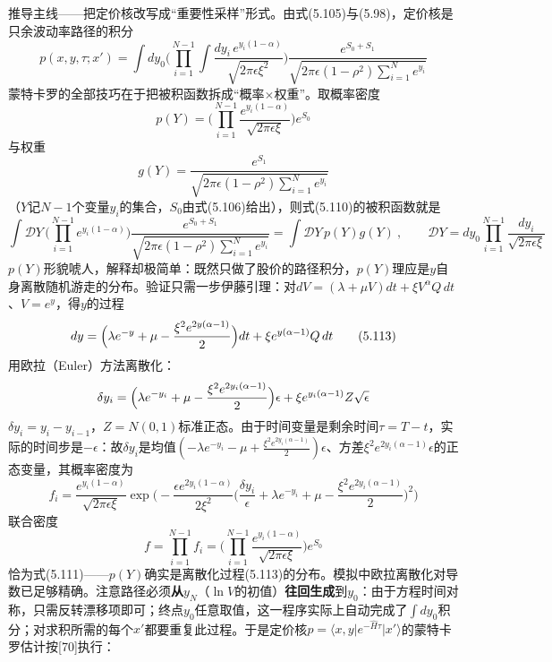 推导主线——把定价核改写成“重要性采样”形式。由式(5.105)与(5.98)，定价核是只余波动率路径的积分
\begin{equation*}
p(x,y,\tau;x')=\int dy_0\biggl(\prod_{i=1}^{N-1}\int
\frac{dy_i\,e^{y_i(1-\alpha)}}{\sqrt{2\pi\epsilon\xi^{2}}}\biggr)
\frac{e^{S_0+S_1}}{\sqrt{2\pi\epsilon(1-\rho^{2})\sum_{i=1}^{N}e^{y_i}}}
\tag{5.110}
\end{equation*}
蒙特卡罗的全部技巧在于把被积函数拆成“概率$\times$权重”。取概率密度
\begin{equation*}
p(Y)=\biggl(\prod_{i=1}^{N-1}\frac{e^{y_i(1-\alpha)}}{\sqrt{2\pi\epsilon\xi}}\biggr)e^{S_0}
\tag{5.111}
\end{equation*}
与权重
\begin{equation*}
g(Y)=\frac{e^{S_1}}{\sqrt{2\pi\epsilon(1-\rho^{2})\sum_{i=1}^{N}e^{y_i}}}
\tag{5.112}
\end{equation*}
（$Y$记$N-1$个变量$y_i$的集合，$S_0$由式(5.106)给出），则式(5.110)的被积函数就是
\begin{equation*}
\int\mathcal{D}Y\,\biggl(\prod_{i=1}^{N-1}e^{y_i(1-\alpha)}\biggr)
\frac{e^{S_0+S_1}}{\sqrt{2\pi\epsilon(1-\rho^{2})\sum_{i=1}^{N}e^{y_i}}}
=\int\mathcal{D}Y\,p(Y)g(Y)\ ,\qquad
\mathcal{D}Y=dy_0\prod_{i=1}^{N-1}\frac{dy_i}{\sqrt{2\pi\epsilon\xi}}
\end{equation*}
$p(Y)$形貌唬人，解释却极简单：既然只做了股价的路径积分，$p(Y)$理应是$y$自身离散随机游走的分布。验证只需一步伊藤引理：对$dV=(\lambda+\mu V)dt+\xi V^{\alpha}Q\,dt$、$V=e^{y}$，得$y$的过程
\begin{equation*}
dy=\Bigl(\lambda e^{-y}+\mu-\frac{\xi^{2}e^{2y(\alpha-1)}}{2}\Bigr)dt
+\xi e^{y(\alpha-1)}Q\,dt
\tag{5.113}
\end{equation*}
用欧拉（Euler）方法离散化：
\begin{equation*}
\delta y_i=\Bigl(\lambda e^{-y_i}+\mu-\frac{\xi^{2}e^{2y_i(\alpha-1)}}{2}\Bigr)\epsilon
+\xi e^{y_i(\alpha-1)}Z\sqrt{\epsilon}
\end{equation*}
$\delta y_i=y_i-y_{i-1}$，$Z=N(0,1)$标准正态。由于时间变量是剩余时间$\tau=T-t$，实际的时间步是$-\epsilon$：故$\delta y_i$是均值$(-\lambda e^{-y_i}-\mu+\frac{\xi^{2}e^{2y_i(\alpha-1)}}{2})\epsilon$、方差$\xi^{2}e^{2y_i(\alpha-1)}\epsilon$的正态变量，其概率密度为
\begin{equation*}
f_i=\frac{e^{y_i(1-\alpha)}}{\sqrt{2\pi\epsilon\xi}}
\exp\biggl(-\frac{\epsilon e^{2y_i(1-\alpha)}}{2\xi^{2}}
\biggl(\frac{\delta y_i}{\epsilon}+\lambda e^{-y_i}+\mu-\frac{\xi^{2}e^{2y_i(\alpha-1)}}{2}\biggr)^{2}\biggr)
\end{equation*}
联合密度
\begin{equation*}
f=\prod_{i=1}^{N-1}f_i
=\biggl(\prod_{i=1}^{N-1}\frac{e^{y_i(1-\alpha)}}{\sqrt{2\pi\epsilon\xi}}\biggr)e^{S_0}
\end{equation*}
恰为式(5.111)——$p(Y)$确实是离散化过程(5.113)的分布。模拟中欧拉离散化对导数已足够精确。注意路径必须\textbf{从}$y_N$（$\ln V$的初值）\textbf{往回生成}到$y_0$：由于方程时间对称，只需反转漂移项即可；终点$y_0$任意取值，这一程序实际上自动完成了$\int dy_0$积分；对求积所需的每个$x'$都要重复此过程。于是定价核$p=\langle x,y\vert e^{-\hat{H}\tau}\vert x'\rangle$的蒙特卡罗估计按[70]执行：

